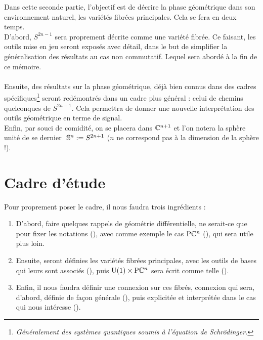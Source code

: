 
Dans cette seconde partie, l'objectif est de décrire la phase géométrique dans son environnement naturel, les variétés fibrées principales. Cela se fera en deux temps.
\\
D'abord, $S^{2n-1}$ sera proprement décrite comme une variété fibrée. Ce faisant, les outils mise en jeu seront exposés avec détail, dans le but de simplifier la généralisation des résultats au cas non commutatif. Lequel sera abordé à la fin de ce mémoire.
\\ \\
Ensuite, des résultats sur la phase géométrique, déjà bien connus dans des cadres spécifiques\footnote{\itshape
	Généralement des systèmes quantiques soumis à l'équation de Schrödinger.} 
\cite{berry_quantal_1997, bohm_geometric_2003, mukunda_quantum_1993, chruscinski_geometric_2004} seront redémontrés dans un cadre plus général : celui de chemins quelconques de $S^{2n-1}$. Cela permettra de donner une nouvelle interprétation des outils géométrique en terme de signal.
\\

Enfin, par souci de comidité, on se placera dans $\mathbb{C}^{n+1}$ et l'on notera la sphère unité de se dernier $\ \mathbb{ S}^{n} := S^{2n+1}$ ($n$ ne correspond pas à la dimension de la sphère !).

\section{Cadre d'étude}\label{sec:cadre_geodiff}

Pour proprement poser le cadre, il nous faudra trois ingrédients :
\begin{enumerate}
	
	\item D'abord, faire quelques rappels de géométrie différentielle, ne serait-ce que pour fixer les notations (), avec comme exemple le cas $\text{\normalfont P}\mathbb{C}^{n}$ (), qui sera utile plus loin. 
	
	\item Ensuite, seront définies les variétés fibrées principales, avec les outils de bases qui leurs sont associés (), puis $\text{\normalfont U}(1)\times \text{\normalfont P}\mathbb{C}^{n}$ sera écrit comme telle ().
	
	\item Enfin, il nous faudra définir une connexion sur ces fibrés, connexion qui sera, d'abord, définie de façon générale (), puis explicitée et interprétée dans le cas qui nous intéresse ().
	
\end{enumerate}



